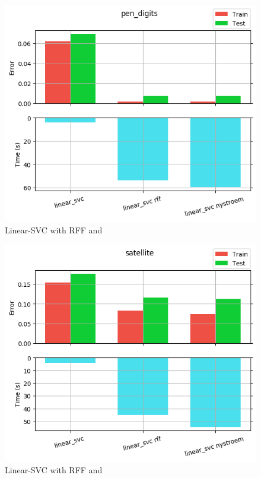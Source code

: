 \begin{figure}[th]
\centering
\includegraphics[scale=\imgscale]{Figures/2_5/pen_digits}
\decoRule
\caption[2.5 pen\tu digits]{Linear-SVC with RFF and \Nys}
\label{fig:2_5_pen_digits}
\end{figure}

\begin{figure}[th]
\centering
\includegraphics[scale=\imgscale]{Figures/2_5/satellite}
\decoRule
\caption[2.5 satellite]{Linear-SVC with RFF and \Nys}
\label{fig:2_5_satellite}
\end{figure}

